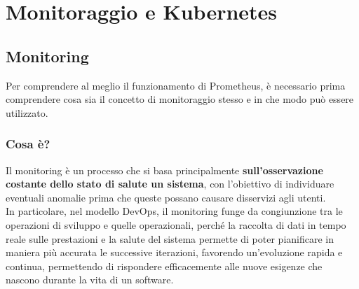 \chapter{Monitoraggio e Kubernetes} \label{chap:monitorin-kubernetes}

\section{Monitoring}

Per comprendere al meglio il funzionamento di Prometheus, è necessario prima comprendere cosa sia il concetto di monitoraggio stesso e in che modo può essere utilizzato.

\subsection{Cosa è?}
Il monitoring è un processo che si basa principalmente \textbf{sull'osservazione costante dello stato di salute un sistema}, con l'obiettivo di individuare eventuali anomalie prima che queste possano causare disservizi agli utenti. \\
In particolare, nel modello DevOps, il monitoring funge da congiunzione tra le operazioni di sviluppo e quelle operazionali, perché la raccolta di dati in tempo reale sulle prestazioni e la salute del sistema permette di poter pianificare in maniera più accurata le successive iterazioni, favorendo un’evoluzione rapida e continua, permettendo di rispondere efficacemente alle nuove esigenze che nascono durante la vita di un software.

